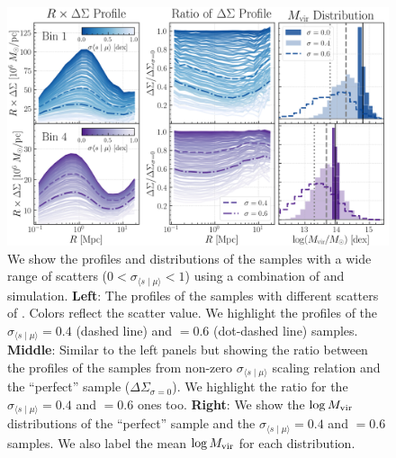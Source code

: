 \documentclass[fleqn,usenatbib,useAMS,english]{mnras}
\begin{document}
    \begin{figure}
        \centering
        \includegraphics[width=16cm]{figure/topn_fig_5}
        \caption{
        We show the \dsigma{} profiles and \mhalo{} distributions of the \topn{} samples with
        a wide range of \mhalo{} scatters ($0<\sigma_{\langle s \mid \mu\rangle}<1$) using a
        combination of  and \smdpl{} simulation.
        \textbf{Left}:
            The \rdsigma{} profiles of the \topn{} samples with different scatters of \mhalo{}.
            Colors reflect the scatter value. We highlight the profiles of the
            $\sigma_{\langle s \mid \mu\rangle}=0.4$ (dashed line) and $=0.6$ (dot-dashed line)
            samples.
        \textbf{Middle}:
            Similar to the left panels but showing the ratio between the \dsigma{} profiles of
            the \topn{} samples from non-zero $\sigma_{\langle s \mid \mu\rangle}$ scaling
            relation and the ``perfect'' sample ($\Delta\Sigma_{\sigma=0}$).
            We highlight the ratio for the $\sigma_{\langle s \mid \mu\rangle}=0.4$ and $=0.6$
            ones too.
        \textbf{Right}:
            We show the $\log M_{\rm vir}$ distributions of the ``perfect'' \topn{} sample and the
            $\sigma_{\langle s \mid \mu\rangle}=0.4$ and $=0.6$ samples.
            We also label the mean $\log M_{\rm vir}$ for each distribution.
        }
        \label{fig:mdpl2}
    \end{figure}
\end{document}
